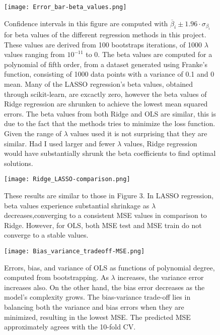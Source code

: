 \documentclass[a4paper,12pt]{article}
\begin{document}
\begin{figure}[H]
\centerline{\texttt{[image: Error\_bar-beta\_values.png]}}
\caption{Confidence intervals in this figure are computed with $\overline{\beta}_i \pm 1.96 \cdot \sigma_{\beta_i}$for beta values of the different regression methods in this project. These values are derived from 100 bootstraps iterations, of 1000 $\lambda$ values ranging from $10^{-11}$ to 0. The beta values are computed for a polynomial of fifth order, from a dataset generated using Franke's function, consisting of 1000 data points with a variance of 0.1 and 0 mean. Many of the LASSO regression's beta values, obtained through scikit-learn, are excactly zero, however the beta values of Ridge regression are shrunken to achieve the lowest mean squared errors. The beta values from both Ridge and OLS are similar, this is due to the fact that the methods tries to minimize the loss function. Given the range of $\lambda$ values used it is not surprising that they are similar. Had I used larger and fewer $\lambda$ values, Ridge regression would have substantially shrunk the beta coefficients to find optimal solutions.}
\label{fig}
\end{figure}

\begin{figure}[H]
\centerline{\texttt{[image: Ridge\_LASSO-comparison.png]}}
\caption{These results are similar to those in Figure 3. In LASSO regression, beta values experience substantial shrinkage as $\lambda$ decreases,converging to a consistent MSE values in comparison to Ridge. However, for OLS, both MSE test and MSE train do not converge to a stable values. }
\label{fig}
\end{figure}

\begin{figure}[H]
\centerline{\texttt{[image: Bias\_variance\_tradeoff-MSE.png]}}
\caption{Errors, bias, and variance of OLS as functions of polynomial degree, computed from bootstrapping. As $\lambda$ increases, the variance error increases also. On the other hand, the bias error decreases as the model's complexity grows. The bias-variance trade-off lies in balancing both the variance and bias errors when they are minimized, resulting in the lowest MSE. The predicted MSE approximately agrees with the 10-fold CV.}
\label{fig}
\end{figure}
\end{document}
